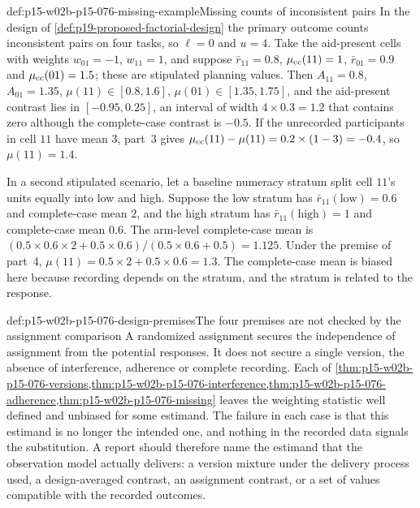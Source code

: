 \begin{hbexample}{def:p15-w02b-p15-076-missing-example}{Missing counts of inconsistent pairs}
In the design of \cref{def:p19-proposed-factorial-design} the primary
outcome counts inconsistent pairs on four tasks, so \(\ell=0\) and
\(u=4\). Take the aid-present cells with weights \(w_{01}=-1\),
\(w_{11}=1\), and suppose \(\bar r_{11}=0.8\),
\(\mu_{\rm cc}(11)=1\), \(\bar r_{01}=0.9\) and
\(\mu_{\rm cc}(01)=1.5\); these are stipulated planning values. Then
\(A_{11}=0.8\), \(A_{01}=1.35\), \(\mu(11)\in[0.8,1.6]\),
\(\mu(01)\in[1.35,1.75]\), and the aid-present contrast lies in
\([-0.95,0.25]\), an interval of width \(4\times0.3=1.2\) that contains
zero although the complete-case contrast is \(-0.5\). If the unrecorded
participants in cell \(11\) have mean \(3\), part~3 gives
\(\mu_{\rm cc}(11)-\mu(11)=0.2\times(1-3)=-0.4\), so \(\mu(11)=1.4\).

In a second stipulated scenario, let a baseline numeracy stratum split
cell \(11\)'s units equally into
low and high. Suppose the low stratum has \(\bar r_{11}(\text{low})=0.6\)
and complete-case mean \(2\), and the high stratum has
\(\bar r_{11}(\text{high})=1\) and complete-case mean \(0.6\). The
arm-level complete-case mean is
\((0.5\times0.6\times2+0.5\times0.6)/(0.5\times0.6+0.5)=1.125\). Under
the premise of part~4, \(\mu(11)=0.5\times2+0.5\times0.6=1.3\). The
complete-case mean is biased here because recording depends on the
stratum, and the stratum is related to the response.
\end{hbexample}

\begin{hbwarning}{def:p15-w02b-p15-076-design-premises}{The four premises are not checked by the assignment comparison}
A randomized assignment secures the independence of assignment from the
potential responses. It does not secure a single version, the absence of
interference, adherence or complete recording. Each of
\cref{thm:p15-w02b-p15-076-versions,thm:p15-w02b-p15-076-interference,thm:p15-w02b-p15-076-adherence,thm:p15-w02b-p15-076-missing}
leaves the weighting statistic well defined and unbiased for some
estimand. The failure in each case is that this estimand is no longer the
intended one, and nothing in the recorded data signals the substitution.
A report should therefore name the estimand that the observation model
actually delivers: a version mixture under the delivery process used, a
design-averaged contrast, an assignment contrast, or a set of values
compatible with the recorded outcomes.
\end{hbwarning}

